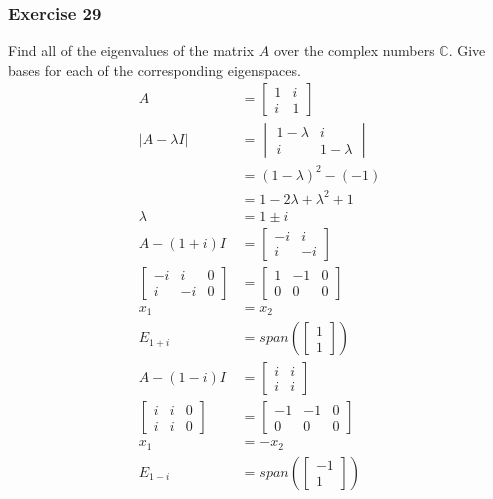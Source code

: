 \documentclass{math}
\begin{document}
\subsubsection*{Exercise 29}
Find all of the eigenvalues of the matrix \( A \) over the complex numbers
\( \mathbb{C} \). Give bases for each of the corresponding eigenspaces.
\begin{align*}
  A &= \begin{bmatrix}1 & i \\ i & 1\end{bmatrix} \\
  |A-\lambda I| &= \begin{vmatrix}
    1-\lambda & i \\
    i & 1-\lambda
  \end{vmatrix} \\
  &= (1-\lambda)^2-(-1) \\
  &= 1-2\lambda+\lambda^2+1 \\
  \lambda &= 1\pm i \\
  A-(1+i)I &= \begin{bmatrix}-i & i \\ i & -i\end{bmatrix} \\
  \left[\begin{array}{cc|c}
    -i & i & 0 \\
    i & -i & 0
  \end{array}\right] &= \begin{bmatrix}
    1 & -1 & 0 \\
    0 & 0 & 0
  \end{bmatrix} \\
  x_1 &= x_2 \\
  E_{1+i} &= span\left(\begin{bmatrix}1 \\ 1\end{bmatrix}\right) \\
  A-(1-i)I &= \begin{bmatrix}i & i \\ i & i\end{bmatrix} \\
  \left[\begin{array}{cc|c}
    i & i & 0 \\
    i & i & 0
  \end{array}\right] &= \begin{bmatrix}
    -1 & -1 & 0 \\
    0 & 0 & 0
  \end{bmatrix} \\
  x_1 &= -x_2 \\
  E_{1-i} &= span\left(\begin{bmatrix}-1 \\ 1\end{bmatrix}\right)
\end{align*}
\end{document}
